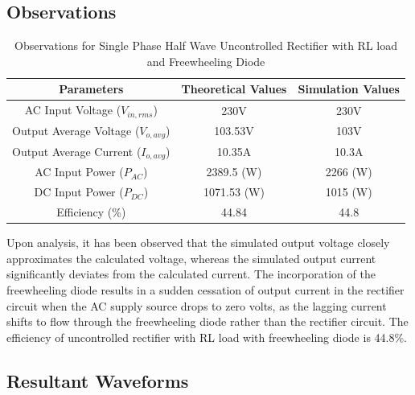 \subsection{Observations}

\begin{table}[h]
    \renewcommand{\arraystretch}{1.3}
    \label{table_observation_3}
    \centering
    \begin{tabular}{|c|c|c|}
        \hline
        Parameters                              & Theoretical Values & Simulation Values \\
        \hline
        \hline
        AC Input Voltage ($ V_{in,rms} $)       & 230V               & 230V              \\
        \hline
        Output Average Voltage ($ V_{o,avg} $)  & 103.53V            & 103V              \\
        \hline
        Output Average Current ($ I_{o,avg}  $) & 10.35A             & 10.3A             \\
        \hline
        AC Input Power ($ P_{AC}  $)            & 2389.5 (W)         & 2266 (W)          \\
        \hline
        DC Input Power ($ P_{DC}  $)            & 1071.53 (W)        & 1015 (W)          \\
        \hline
        Efficiency (\%)                         & 44.84              & 44.8              \\
        \hline
    \end{tabular}
    \caption{Observations for Single Phase Half Wave Uncontrolled Rectifier with RL load and Freewheeling Diode}

\end{table}



Upon analysis, it has been observed that the simulated output voltage closely approximates the calculated voltage, whereas the simulated output current significantly deviates from the calculated current. The incorporation of the freewheeling diode results in a sudden cessation of output current in the rectifier circuit when the AC supply source drops to zero volts, as the lagging current shifts to flow through the freewheeling diode rather than the rectifier circuit.
The efficiency of uncontrolled rectifier with RL load with freewheeling diode is 44.8\%.

\pagebreak

\subsection{Resultant Waveforms}


